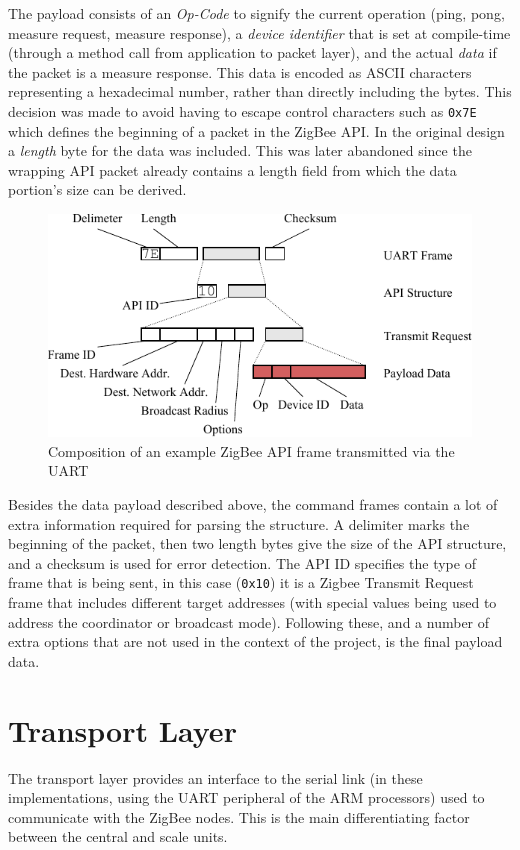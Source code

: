 The payload consists of an \emph{Op-Code} to signify the current operation (ping, pong, measure request, measure response), a \emph{device identifier} that is set at compile-time (through a method call from application to packet layer), and the actual \emph{data} if the packet is a measure response. This data is encoded as ASCII characters representing a hexadecimal number, rather than directly including the bytes. This decision was made to avoid having to escape control characters such as \texttt{0x7E} which defines the beginning of a packet in the ZigBee API. In the original design a \emph{length} byte for the data was included. This was later abandoned since the wrapping API packet already contains a length field from which the data portion's size can be derived.


\begin{figure}
\includegraphics[width=\textwidth]{images/packets.pdf}
\caption{Composition of an example ZigBee API frame transmitted via the UART}
\label{packets-example}
\end{figure}

Besides the data payload described above, the command frames contain a lot of extra information required for parsing the structure. A delimiter marks the beginning of the packet, then two length bytes give the size of the API structure, and a checksum is used for error detection. The API ID specifies the type of frame that is being sent, in this case (\texttt{0x10}) it is a Zigbee Transmit Request frame that includes different target addresses (with special values being used to address the coordinator or broadcast mode). Following these, and a number of extra options that are not used in the context of the project, is the final payload data.

\section{Transport Layer}
The transport layer provides an interface to the serial link (in these implementations, using the UART peripheral of the ARM processors) used to communicate with the ZigBee nodes. This is the main differentiating factor between the central and scale units.

